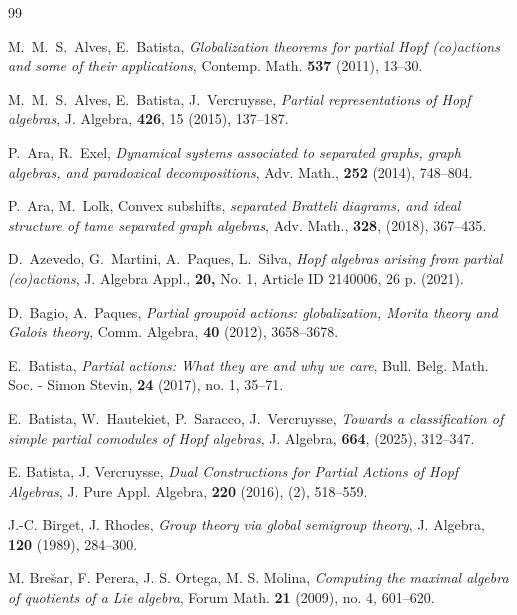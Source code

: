 \documentclass{amsart}
\newcommand{\0}{{\vartheta}}
\theoremstyle{definition}
\theoremstyle{remark}
\numberwithin{equation}{section}
\newtheorem*{Theorem A}{\textbf{Theorem A}}
\newtheorem*{Corollary E}{\textbf{Corollary E}}
\newtheorem*{Corollary F}{\textbf{Corollary F}}
\newtheorem*{Theorem B}{\textbf{Theorem B}}
\newtheorem*{Theorem C}{\textbf{Theorem C}}
\newtheorem*{Theorem D}{\textbf{Theorem B}}
\newtheorem*{p a}{\textbf{Proof of  Theorem A}}
\newtheorem*{p b}{\textbf{Proof of Theorem B}}
\newtheorem*{p c}{\textbf{Proof of  Theorem C}}
\newtheorem*{p d}{\textbf{Proof of  Theorem D}}
\begin{document}
\begin{thebibliography}{99}

   M.\ M.\ S.\ Alves,   E.\ Batista,  {\em Globalization theorems for partial Hopf
(co)actions and some of their applications},  Contemp. Math. {\bf  537}  (2011), 13--30.

  M.\ M.\ S.\ Alves,   E.\ Batista,  J.\ Vercruysse, {\em Partial representations of Hopf algebras},  J. Algebra,
{\bf  426}, 15  (2015),  137--187.

 P.\  Ara,  R.\  Exel, 
{\em Dynamical systems associated to separated graphs, graph algebras, and paradoxical decompositions},   Adv.  Math., 
{\bf 252} (2014), 748--804.   




 P.\ Ara, M.\ Lolk,
Convex subshifts, {\em separated Bratteli diagrams, and ideal structure of tame separated graph algebras},
 Adv. Math., {\bf  328}, (2018),  367--435.

 D.\ Azevedo, G.\ Martini, A.\ Paques, L.\ Silva, {\em Hopf algebras arising from partial (co)actions},  J. Algebra Appl., {\bf 20,} No. 1, Article ID 2140006, 26 p. (2021).

 D.\ Bagio,  A.\ Paques, {\em Partial groupoid actions: globalization, Morita theory and Galois theory},  Comm. Algebra, {\bf 40}  (2012), 3658--3678.

 E.\ Batista, {\em Partial actions: What they are and why we care},  Bull. Belg. Math. Soc. - Simon Stevin, {\bf 24}  (2017), no. 1, 
 35--71.
 


 E.\ Batista, W.\ Hautekiet, P.\ Saracco, 
J.\ Vercruysse, {\em Towards a classification of simple partial comodules of Hopf algebras},  J. Algebra, {\bf 664}, (2025), 312--347.

 E. Batista, J. Vercruysse, {\em Dual Constructions for Partial Actions of Hopf Algebras}, J. Pure Appl. Algebra, {\bf 220} (2016), (2),  518--559.

 J.-C. Birget, J. Rhodes, {\em Group theory via global semigroup theory},
 J.  Algebra, {\bf 120}  (1989), 284--300.

 M. Bre{\u s}ar, F. Perera, J. S. Ortega, M. S. Molina, 
{\em Computing the maximal algebra of quotients of a Lie algebra}, 
Forum Math. {\bf 21} (2009), no. 4, 601--620.



\end{thebibliography}
\end{document}

